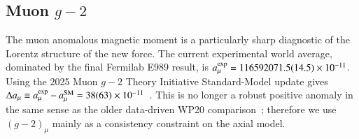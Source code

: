 \documentclass[onecolumn, aps, nofootinbib, prd, preprint, floats, floatfix, amsmath, amssymb, superscriptaddress, preprintnumbers]{revtex4-1}
\begin{document}


\subsection{Muon $g-2$}
The muon anomalous magnetic moment is a particularly sharp diagnostic of the Lorentz structure of the new force. The current experimental world average, dominated by the final Fermilab E989 result, is \(a_\mu^{\rm exp}=116592071.5(14.5)\times10^{-11}\). Using the 2025 Muon \(g-2\) Theory Initiative Standard-Model update gives \(\Delta a_\mu\equiv a_\mu^{\rm exp}-a_\mu^{\rm SM} =38(63)\times10^{-11}\)~\cite{Muong-2:2025xyk,Aliberti:2025beg}. This is no longer a robust positive anomaly in the same sense as the older data-driven WP20 comparison~\cite{Aoyama:2020ynm}; therefore we use \((g-2)_\mu\) mainly as a consistency constraint on the axial model.
\end{document}
